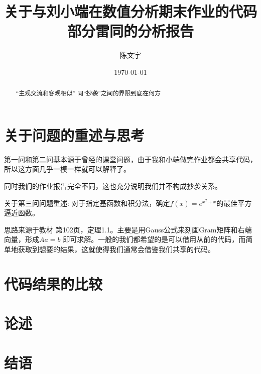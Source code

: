 \documentclass[UTF8]{ctexart}
\begin{document}
\title{关于与刘小端在数值分析期末作业的代码部分雷同的分析报告}
%
\author{陈文宇}

\date{\today}

\maketitle{}
\begin{abstract}
	“主观交流和客观相似” 同“抄袭”之间的界限到底在何方
\end{abstract}

\newpage
\tableofcontents
\newpage

\section{关于问题的重述与思考}
第一问和第二问基本源于曾经的课堂问题，由于我和小端做完作业都会共享代码，所以这方面几乎一模一样就可以解释了。

同时我们的作业报告完全不同，这也充分说明我们并不构成抄袭关系。

关于第三问问题重述:
对于指定基函数和积分法，确定$f(x)=e^{x^{2}+x}$的最佳平方逼近函数。

思路来源于教材 第102页，定理1.1。主要是用Gauss公式来刻画Gram矩阵和右端向量，形成$Aa=b$
即可求解。一般的我们都希望的是可以借用从前的代码，而简单地获取到想要的结果，这就使得我们通常会借鉴我们共享的代码。




\section{代码结果的比较}

\section{论述}
  
\section{结语}
\end{document}
